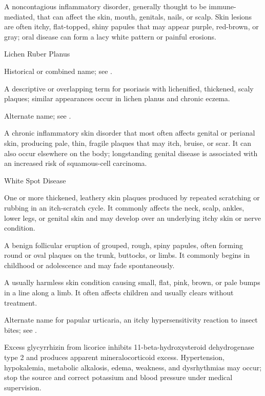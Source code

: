  A noncontagious inflammatory disorder, generally thought to be immune-mediated, that can affect the skin, mouth, genitals, nails, or scalp. Skin lesions are often itchy, flat-topped, shiny papules that may appear purple, red-brown, or gray; oral disease can form a lacy white pattern or painful erosions.

\synonyms
Lichen Ruber Planus

 Historical or combined name; see .

 A descriptive or overlapping term for psoriasis with lichenified, thickened, scaly plaques; similar appearances occur in lichen planus and chronic eczema.

 Alternate name; see .

 A chronic inflammatory skin disorder that most often affects genital or perianal skin, producing pale, thin, fragile plaques that may itch, bruise, or scar. It can also occur elsewhere on the body; longstanding genital disease is associated with an increased risk of squamous-cell carcinoma.


\synonyms
White Spot Disease

 One or more thickened, leathery skin plaques produced by repeated scratching or rubbing in an itch-scratch cycle. It commonly affects the neck, scalp, ankles, lower legs, or genital skin and may develop over an underlying itchy skin or nerve condition.

 A benign follicular eruption of grouped, rough, spiny papules, often forming round or oval plaques on the trunk, buttocks, or limbs. It commonly begins in childhood or adolescence and may fade spontaneously.

 A usually harmless skin condition causing small, flat, pink, brown, or pale bumps in a line along a limb. It often affects children and usually clears without treatment.

 Alternate name for papular urticaria, an itchy hypersensitivity reaction to insect bites; see .

 Excess glycyrrhizin from licorice inhibits 11-beta-hydroxysteroid dehydrogenase type 2 and produces apparent mineralocorticoid excess. Hypertension, hypokalemia, metabolic alkalosis, edema, weakness, and dysrhythmias may occur; stop the source and correct potassium and blood pressure under medical supervision.

